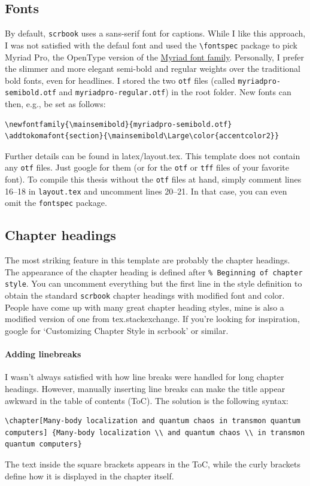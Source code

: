 \subsection{Fonts}
By default, \verb|scrbook| uses a sans-serif font for captions. While I like this approach, I was not satisfied with the defaul font and used the \verb|\fontspec| package to pick Myriad Pro, the OpenType version of the \href{https://en.wikipedia.org/wiki/Myriad_(typeface)}{Myriad font family}.
Personally, I prefer the slimmer and more elegant semi-bold and regular weights over the traditional bold fonts, even for headlines. I stored the two \verb|otf| files (called \verb|myriadpro-semibold.otf| and \verb|myriadpro-regular.otf|) in the root folder. New fonts can then, e.g., be set as follows:
\begin{lstlisting}
\newfontfamily{\mainsemibold}{myriadpro-semibold.otf}
\addtokomafont{section}{\mainsemibold\Large\color{accentcolor2}}
\end{lstlisting}
Further details can be found in latex/layout.tex. This template does not contain any \verb|otf| files. Just google for them (or for the \verb|otf| or \verb|tff| files of your favorite font).
To compile this thesis without the \verb|otf| files at hand, simply comment lines 16--18 in \verb|layout.tex| and uncomment lines 20--21. In that case, you can even omit the \verb|fontspec| package.


\subsection{Chapter headings}
The most striking feature in this template are probably the chapter headings.
The appearance of the chapter heading is defined after \verb|% Beginning of chapter style|. You can uncomment everything but the first line in the style definition to obtain the standard \verb|scrbook| chapter headings with modified font and color. People have come up with many great chapter heading styles, mine is also a modified version of one from tex.stackexchange. If you’re looking for inspiration, google for `Customizing Chapter Style in scrbook' or similar.

\paragraph{Adding linebreaks}
I wasn't always satisfied with how line breaks were handled for long chapter headings. However, manually inserting line breaks can make the title appear awkward in the table of contents (ToC). The solution is the following syntax:
\begin{lstlisting}
\chapter[Many-body localization and quantum chaos in transmon quantum computers] {Many-body localization \\ and quantum chaos \\ in transmon quantum computers}
\end{lstlisting}
The text inside the square brackets appears in the ToC, while the curly brackets define how it is displayed in the chapter itself.

